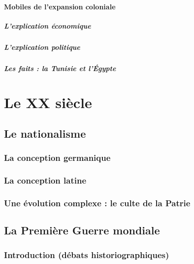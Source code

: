 \documentclass[12pt]{report}
\begin{document}
\subsection{Mobiles de l'expansion coloniale}

\subsubsection{L'explication économique}

\subsubsection{L'explication politique}

\subsubsection{Les faits : la Tunisie et l'Égypte}




\part{Le XX siècle}

\chapter{Le nationalisme}

\section{La conception germanique}

\section{La conception latine}

\section{Une évolution complexe : le culte de la Patrie}


\chapter{La Première Guerre mondiale}

\section*{Introduction (débats historiographiques)}
\end{document}
